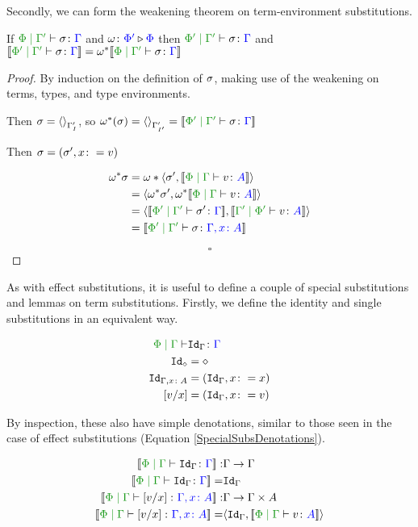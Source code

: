 \documentclass{Report}
\begin{document}
Secondly, we can form the weakening theorem on term-environment substitutions.


\begin{theorem}
    If $\etyperelation{\P}{\G'}{\si}{\G}$ and $\omega \colon {\color{blue}\Phi'} \triangleright {\color {blue} \Phi}$ then $\etyperelation{\P'}{\G'}{\si}{\G}$ and $\deno{\etyperelation{\P'}{\G'}{\si}{\G}} = \w\star\deno{\etyperelation{\P}{\G'}{\si}{\G}}$
\end{theorem}

\begin{proof}
    By induction on the definition of $\sigma$, making use of the weakening on terms, types, and type environments.

    Then $\sigma = \left\langle\right\rangle_{\Gamma'_{I}}$, so $\w\star(\si) = \term{\G'_{I'}} = \deno{\etyperelation{\P'}{\G'}{\si}{\G}}$
    
    Then $\sigma = (\sigma',x\colon= v)$
    
    \begin{align*}
        \w\star\si & = \w*\pr{\si'}{\deno{\gpetyperelation{v}{A}}}\\
        & = \pr{\w\star\si'}{\w\star\deno{\gpetyperelation{v}{A}}}\\
        &=\pr{\deno{\etyperelation{\P'}{\G'}{\si'}{\G}}}{\deno{\etyperelation{\G'}{\P'}{v}{A}}}\\
        &=\deno{\etyperelation{\P'}{\G'}{\si}{\gax}}
    \end{align*}

    $$\square$$

\end{proof}

As with effect substitutions, it is useful to define a couple of special substitutions and lemmas on term substitutions. Firstly, we define the identity and single substitutions in an equivalent way.

\begin{align*}
    \etyperelation{\P}{\G}{&\Id{\G}}{\G}\\
    \Id{\nil} & = \nil\\
    \Id{\gax} & = (\idg, x\setto x)\\
    \ssub{x}{v} & = (\idg, x\setto v)\\
\end{align*}

By inspection, these also have simple denotations, similar to those seen in the case of effect substitutions (Equation \ref{SpecialSubsDenotations}).

\begin{align*}
    \deno{\etyperelation{\P}{\G}{\Id{\G}}{\G}}: & \G\rightarrow\G\\
    \deno{\etyperelation{\P}{\G}{\Id{\G}}{\G}} = &  \idg\\
    \deno{\etyperelation{\P}{\G}{\ssub{x}{v}}{\gax}}: & \G\rightarrow \G\times A\\
    \deno{\etyperelation{\P}{\G}{\ssub{x}{v}}{\gax}} = & \pr{\idg}{\deno{\gpetyperelation{v}{A}}}
\end{align*}
\end{document}
